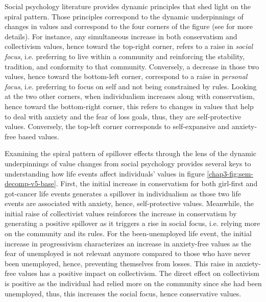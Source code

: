 Social psychology literature provides dynamic principles that shed light on the spiral pattern. Those principles correspond to the dynamic underpinnings of changes in values and correspond to the four corners of the figure (see \citealt{Schwartz2012Overview} for more details). For instance, any simultaneous increase in both conservatism and collectivism values, hence toward the top-right corner, refers to a raise in \textit{social focus}, i.e. preferring to live within a community and reinforcing the stability, tradition, and conformity to that community. Conversely, a decrease in those two values, hence toward the bottom-left corner, correspond to a raise in \textit{personal focus}, i.e. preferring to focus on self and not being constrained by rules. Looking at the two other corners, when individualism increases along with conservatism, hence toward the bottom-right corner, this refers to changes in values that help to deal with anxiety and the fear of loss goals, thus, they are self-protective values. Conversely, the top-left corner corresponds to self-expansive and anxiety-free based values.

Examining the spiral pattern of spillover effects through the lens of the dynamic underpinnings of value changes from social psychology provides several keys to understanding how life events affect individuals' values in figure \ref{chap3-fig:sem-decomp-v5-base}.
First, the initial increase in conservatism for both girl-first and got-cancer life events generates a spillover in individualism as those two life events are associated with anxiety, hence, self-protective values. Meanwhile, the initial raise of collectivist values reinforces the increase in conservatism by generating a positive spillover as it triggers a rise in social focus, i.e. relying more on the community and its rules.
For the been-unemployed life event, the initial increase in progressivism characterizes an increase in anxiety-free values as the fear of unemployed is not relevant anymore compared to those who have never been unemployed, hence, preventing themselves from losses. This raise in anxiety-free values has a positive impact on collectivism. The direct effect on collectivism is positive as the individual had relied more on the community since she had been unemployed, thus, this increases the social focus, hence conservative values.